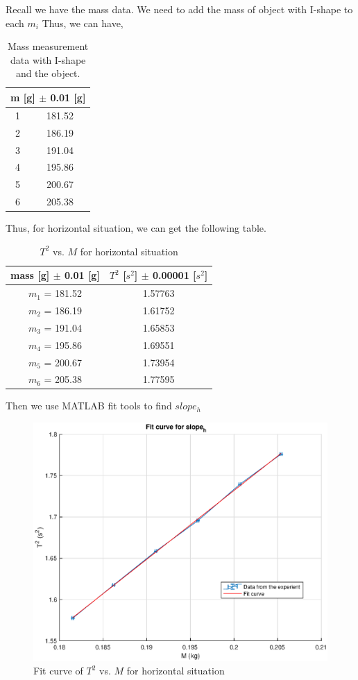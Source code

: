 Recall we have the mass data. 
We need to add the mass of object with I-shape to each $m_i$
Thus, we can have,

\begin{table}[H]
\centering
\begin{tabular}{|c|c|}
\hline
\multicolumn{2}{|c|}{m [g] $\pm$ 0.01 [g]} \\ \hline
1 & 181.52 \\ \hline
2 & 186.19 \\ \hline
3 & 191.04 \\ \hline
4 & 195.86 \\ \hline
5 & 200.67 \\ \hline
6 & 205.38 \\ \hline
\end{tabular}
\caption{Mass measurement data with I-shape and the object.}
\label{massofweight1}
\end{table}

Thus, for horizontal situation, we can get the following table.

\begin{table}[H]
	\centering
	\begin{tabular}{|c|c|}
	\hline
	mass [g] $\pm$ 0.01 [g] & $T^2$ [$s^2$] $\pm$ 0.00001 [$s^2$] \\ \hline
	$m_1$ = 181.52  & 1.57763 \\ \hline
	$m_2$ = 186.19  & 1.61752 \\ \hline
	$m_3$ = 191.04  & 1.65853 \\ \hline
	$m_4$ = 195.86  & 1.69551 \\ \hline
	$m_5$ = 200.67  & 1.73954 \\ \hline
	$m_6$ = 205.38  & 1.77595 \\ \hline
	\end{tabular}
	\caption{$T^2$ vs. $M$ for horizontal situation}
	\label{T2vsM_0}
\end{table}

Then we use MATLAB fit tools to find $slope_{h}$

\begin{figure}[H]
	\centering
	\includegraphics[width=15cm]{matlab/fitfig/m1}
	\caption{Fit curve of $T^2$ vs. $M$ for horizontal situation}
\end{figure}

